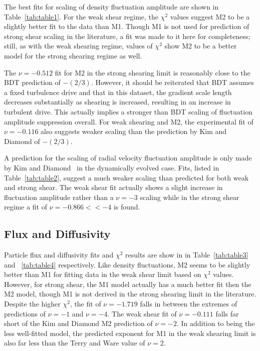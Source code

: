 \documentclass[aip,pop,amsmath,amssymb,preprint,superscriptaddress]{revtex4-1} %
\begin{document}
The best fits for scaling of density fluctuation amplitude are shown in Table~\ref{tab:table1}. For the weak shear regime, the $\chi^{2}$ values suggest M2 to be a slightly better fit to the data than M1. Though M1 is not used for prediction of strong shear scaling in the literature, a fit was made to it here for completeness; still, as with the weak shearing regime, values of $\chi^{2}$ show M2 to be a better model for the strong shearing regime as well.

The $\nu = -0.512$ fit for M2 in the strong shearing limit is reasonably close to the BDT prediction of $-(2/3)$. However, it should be reiterated that BDT assumes a fixed turbulence drive and that in this dataset, the gradient scale length decreases substantially as shearing is increased, resulting in an increase in turbulent drive.  This actually implies a stronger than BDT scaling of fluctuation amplitude suppression overall. For weak shearing and M2, the experimental fit of $\nu = -0.116$ also suggests weaker scaling than the prediction by Kim and Diamond of $-(2/3)$.

A prediction for the scaling of radial velocity fluctuation amplitude is only made by Kim and Diamond~\cite{kim04} in the dynamically evolved case. Fits, listed in Table~\ref{tab:table2}, suggest a much weaker scaling than predicted for both weak and strong shear. The weak shear fit actually shows a slight increase in fluctuation amplitude rather than a $\nu = -3$ scaling while in the strong shear regime a fit of $\nu = -0.866 << -4$ is found.

\subsection{Flux and Diffusivity}

Particle flux and diffusivity fits and $\chi^{2}$ results are show in in Table~\ref{tab:table3} and ~\ref{tab:table4} respectively. Like density fluctuations, M2 seems to be slightly better than M1 for fitting data in the weak shear limit based on $\chi^{2}$ values.  However, for strong shear, the M1 model actually has a much better fit then the M2 model, though M1 is not derived in the strong shearing limit in the literature. Despite the higher $\chi^{2}$, the fit of $\nu = -1.719$ falls in between the extremes of predictions of $\nu = -1$ and $\nu = -4$. The weak shear fit of $\nu = -0.111$ falls far short of the Kim and Diamond M2 prediction of $\nu = -2$. In addition to being the less well-fitted model, the predicted exponent for M1 in the weak shearing limit is also far less than the Terry and Ware value of $\nu = 2$.
\end{document}
